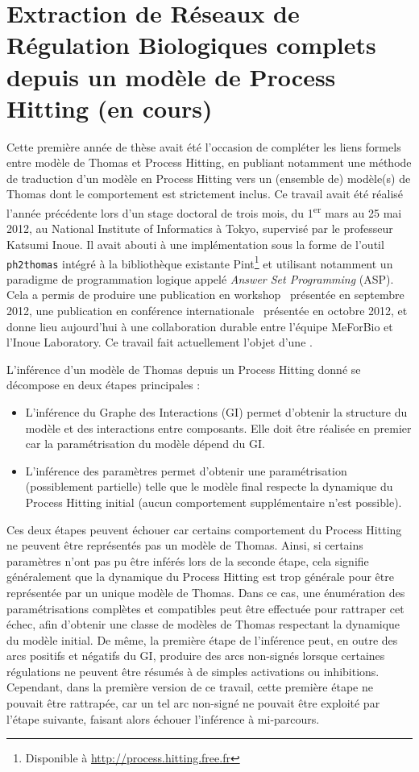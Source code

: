 \section{Extraction de Réseaux de Régulation Biologiques complets depuis un modèle de Process Hitting \normalsize(en cours)}
\label{sec:tcs}

Cette première année de thèse avait été l'occasion de compléter les liens formels entre modèle de Thomas et Process Hitting,
en publiant notamment une méthode de traduction d'un modèle en Process Hitting vers un (ensemble de) modèle(s) de Thomas dont le comportement est strictement inclus.
Ce travail avait été réalisé l'année précédente lors d'un stage doctoral de trois mois, du 1\textsuperscript{er} mars au 25 mai 2012, au National Institute of Informatics à Tokyo, supervisé par le professeur Katsumi Inoue.
Il avait abouti à une implémentation sous la forme de l'outil \texttt{ph2thomas} intégré à la bibliothèque existante Pint\footnote{Disponible à \url{http://process.hitting.free.fr}} et utilisant notamment un paradigme de programmation logique appelé \emph{Answer Set Programming} (ASP).
Cela a permis de produire une publication en workshop~\cite{FPIMR12-LDSSB} présentée en septembre 2012, une publication en conférence internationale~\cite{FPIMR12-CMSB} présentée en octobre 2012, et donne lieu aujourd'hui à une collaboration durable entre l'équipe MeForBio et l'Inoue Laboratory.
Ce travail fait actuellement l'objet d'une .

L'inférence d'un modèle de Thomas depuis un Process Hitting donné se décompose en deux étapes principales :
\begin{itemize}
  \item L'inférence du Graphe des Interactions (GI) permet d'obtenir la structure du modèle et des interactions entre composants.
  Elle doit être réalisée en premier car la paramétrisation du modèle dépend du GI.
  \item L'inférence des paramètres permet d'obtenir une paramétrisation (possiblement partielle) telle que le modèle final respecte la dynamique du Process Hitting initial (aucun comportement supplémentaire n'est possible).
\end{itemize}
Ces deux étapes peuvent échouer car certains comportement du Process Hitting ne peuvent être représentés pas un modèle de Thomas.
Ainsi, si certains paramètres n'ont pas pu être inférés lors de la seconde étape, cela signifie généralement que la dynamique du Process Hitting est trop générale pour être représentée par un unique modèle de Thomas.
Dans ce cas, une énumération des paramétrisations complètes et compatibles peut être effectuée pour rattraper cet échec, afin d'obtenir une classe de modèles de Thomas respectant la dynamique du modèle initial.
De même, la première étape de l'inférence peut, en outre des arcs positifs et négatifs du GI, produire des arcs non-signés lorsque certaines régulations ne peuvent être résumés à de simples activations ou inhibitions.
Cependant, dans la première version de ce travail, cette première étape ne pouvait être rattrapée,
car un tel arc non-signé ne pouvait être exploité par l'étape suivante, faisant alors échouer l'inférence à mi-parcours.

